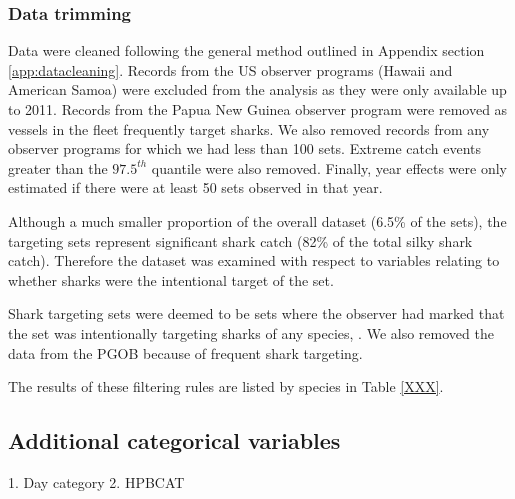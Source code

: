 \subsubsection{Data trimming}

Data were cleaned following the general method outlined in Appendix section \ref{app:datacleaning}. Records from the US observer programs (Hawaii and American Samoa) were excluded from the analysis as they were only available up to 2011. Records from the Papua New Guinea observer program were removed as vessels in the fleet frequently target sharks. We also removed records from any observer programs for which we had less than 100 sets. Extreme catch events greater than the $97.5^{th}$ quantile were also removed. Finally, year effects were only estimated if there were at least 50 sets observed in that year.

Although a much smaller proportion of the overall dataset (6.5\% of the sets), the targeting sets represent significant shark catch (82\% of the total silky shark catch). Therefore the dataset was examined with respect to variables relating to whether sharks were the intentional target of the set. 

Shark targeting sets were deemed to be sets where the observer had marked that the set was intentionally targeting sharks of any species, . We also removed the data from the PGOB because of frequent shark targeting. 

The results of these filtering rules are listed by species in Table \ref{XXX}.

\subsection{Additional categorical variables}
1. Day category
2. HPBCAT

